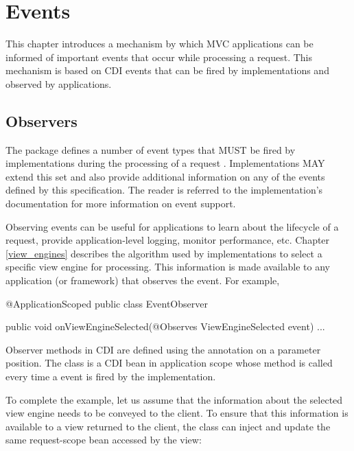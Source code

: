 \chapter{Events}
\label{events}

This chapter introduces a mechanism by which MVC applications can be informed 
of important events that occur while processing a request. This mechanism 
is based on CDI events that can be fired by implementations and observed by 
applications.

\section{Observers}
\label{observers}

The package  defines a number of event types that MUST be 
fired by implementations during the processing of a request . 
Implementations MAY
extend this set and also provide additional information on any of the events defined
by this specification. The reader is referred to the implementation's documentation
for more information on event support.

Observing events can be useful for applications to learn about the lifecycle of a 
request, provide application-level logging, monitor performance, etc. Chapter 
\ref{view_engines} describes the algorithm used by implementations to select a
specific view engine for processing. This information is made available to any
application (or framework) that observes the  event. For
example,

\begin{listing}{1}
@ApplicationScoped
public class EventObserver {

    public void onViewEngineSelected(@Observes ViewEngineSelected event) {
        ...
    }
}
\end{listing}

Observer methods in CDI are defined using the  annotation on 
a parameter position.
The class  is a CDI bean in application scope whose method
 is called every time a  event
is fired by the implementation. 

To complete the example, let us assume that the information about the selected
view engine needs to be conveyed to the client. To ensure that this information
is available to a view returned to the client, the  class
can inject and update the same request-scope bean accessed by the view:

